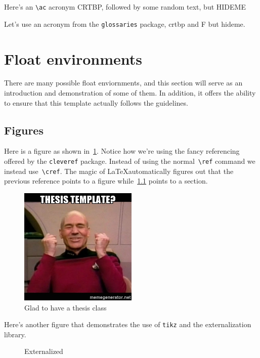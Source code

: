Here's an \verb|\ac| acronym \ac{CRTBP}, followed by some random text, but \ac{HIDEME}


Let's use an acronym from the \texttt{glossaries} package, \acrfull{crtbp} and \gls{F} but \acrfull{hideme}.

\section{Float environments}
There are many possible float enviornments, and this section will serve as an introduction and demonstration of some of them.
In addition, it offers the ability to ensure that this template actually follows the guidelines.

\subsection{Figures}\label{ssec:figures}

Here is a figure as shown in~\cref{fig:picard}.
Notice how we're using the fancy referencing offered by the \verb+cleveref+ package. 
Instead of using the normal~\verb+\ref+ command we instead use~\verb+\cref+. 
The magic of \LaTeX automatically figures out that the previous reference points to a figure while~\cref{ssec:figures} points to a section.

\begin{figure}
    \centering
    \includegraphics[width=0.5\textwidth]{figures/picard_yes.jpg}
    \caption[Damage report!]{Glad to have a thesis class\label{fig:picard}}
\end{figure}

Here's another figure that demonstrates the use of \texttt{tikz} and the externalization library.
\begin{figure}
    \centering
    \caption{Externalized\label{fig:tikz}}
\end{figure}

